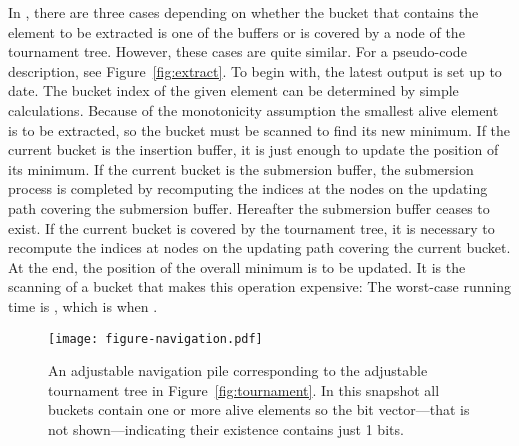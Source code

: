 \documentclass[final,onetabnum,onefignum,onethmnum]{siamltex}
\newcommand{\Extract}{\mbox{}}
\begin{document}
In \Extract{}, there are three cases depending on whether the bucket
that contains the element to be extracted is one of the buffers or
is covered by a node of the tournament tree.  However, these cases are quite
similar. For a pseudo-code description, see Figure~\ref{fig:extract}.
To begin with, the latest output is set up to date.  The bucket index
of the given element can be determined by simple calculations.
Because of the monotonicity assumption the smallest alive element 
is to be extracted, so the bucket must be scanned to find
its new minimum.  If the current bucket is the insertion buffer, it is
just enough to update the position of its minimum.  If the current
bucket is the submersion buffer, the submersion process is completed
by recomputing the indices at the nodes on the updating path covering the
submersion buffer. Hereafter the submersion buffer ceases to exist.
If the current bucket is covered by the tournament tree, it is
necessary to recompute the indices at nodes on the updating path covering
the current bucket. At the end, the position of the overall minimum is
to be updated.  It is the scanning of a bucket that makes this
operation expensive: The worst-case running time is ,
which is  when .

\begin{figure}[tb!]
\begin{center}
\centerline{\texttt{[image: figure-navigation.pdf]}}
\end{center}

\vspace*{-0.5cm}
\caption{An adjustable navigation pile corresponding to the adjustable
  tournament tree in \mbox{Figure}~\ref{fig:tournament}. In this snapshot all
  buckets contain one or more alive elements so the bit vector---that
  is not shown---indicating their existence contains just 1 bits.}
\label{fig:pile}
\end{figure}
\end{document}
